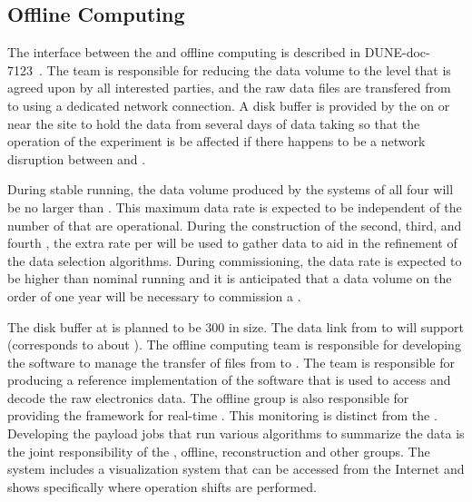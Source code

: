 \subsection{Offline Computing} %
\label{sec:fd-daq-intfc-fnal-cmptg}

The interface between the  and offline computing is
described in DUNE-doc-7123~\cite{docdb-7123}.
The  team is responsible for reducing the data volume
to the level that is agreed upon by all interested parties, and the
raw data files are transfered from \surf to \fnal using a
dedicated network connection.
A disk buffer is provided by the  on or near the \surf
site to hold the data from several days of data taking so that the
operation of the experiment is be affected if there happens to
be a network disruption between \surf and \fnal.

During stable running, the data volume produced by the
 systems of all four  will be no larger
than \offsitepbpy.
This maximum data rate is expected to be independent of the number of
 that are operational.
During the construction of the second, third, and fourth
, the extra rate per  will be used
to gather data to aid in the refinement of the data selection
algorithms.
During commissioning, the data rate is expected to be higher than
nominal running and it is anticipated that  %
a data volume on the order of one year will be necessary to commission a .

The disk buffer at \surf is planned to be \SI{300}{\TB} in size.
The data link from \surf to \fnal will support \surffnalbw
(\offsitepbpy corresponds to about \offsitegbps).
The offline computing team is responsible for developing the
software to manage the transfer of files from \surf to \fnal.
The  team is responsible for producing a reference
implementation of the software that is used to access and decode the
raw electronics data.
The offline group is also responsible for providing the framework
for real-time . 
This monitoring is distinct from the .
Developing the payload jobs that run various algorithms to
summarize the data is the joint responsibility of the , offline,
reconstruction and other groups.
The  system includes a visualization system that can be
accessed from the Internet and shows specifically where operation shifts are
performed.

